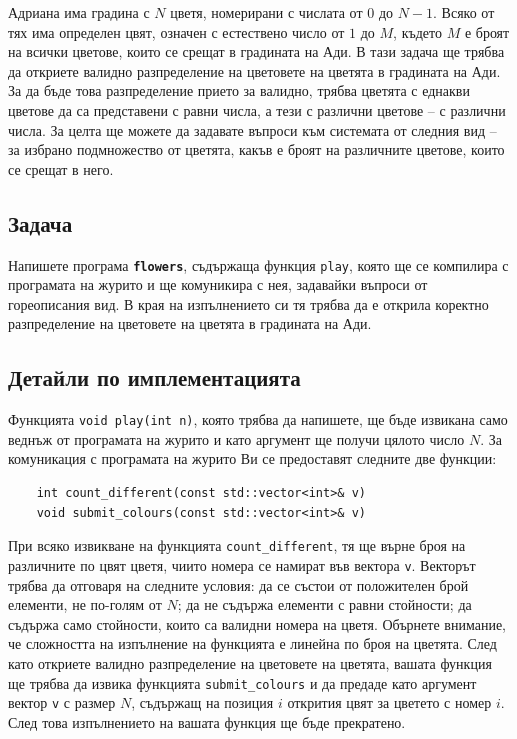 \documentclass[12pt]{article}
\begin{document}
\renewcommand{\header}{
	XLIII НАЦИОНАЛНА ОЛИМПИАДА ПО ИНФОРМАТИКА\\
	Областен кръг, 2 февруари 2027 г.\\
	Група A – 11, 12 клас
}

Адриана има градина с $N$ цветя, номерирани с числата от $0$ до $N-1$. Всяко от тях има определен цвят, означен с естествено число от $1$ до $M$, където $M$ е броят на всички цветове, които се срещат в градината на Ади. В тази задача ще трябва да откриете валидно разпределение на цветовете на цветята в градината на Ади. За да бъде това разпределение прието за валидно, трябва цветята с еднакви цветове да са представени с равни числа, а тези с различни цветове – с различни числа. За целта ще можете да задавате въпроси към системата от следния вид – за избрано подмножество от цветята, какъв е броят на различните цветове, които се срещат в него.

\subsection{Задача}
Напишете програма \textbf{\texttt{flowers}}, съдържаща функция \texttt{play}, която ще се компилира с програмата на журито и ще комуникира с нея, задавайки въпроси от гореописания вид. В края на изпълнението си тя трябва да е открила коректно разпределение на цветовете на цветята в градината на Ади.

\subsection{Детайли по имплементацията}
Функцията \texttt{void play(int n)}, която трябва да напишете, ще бъде извикана само веднъж от програмата на журито и като аргумент ще получи цялото число $N$. За комуникация с програмата на журито Ви се предоставят следните две функции:

\begin{lstlisting}
    int count_different(const std::vector<int>& v)
    void submit_colours(const std::vector<int>& v)
\end{lstlisting}

При всяко извикване на функцията \texttt{count\_different}, тя ще върне броя на различните по цвят цветя, чиито номера се намират във вектора \texttt{v}. Векторът трябва да отговаря на следните условия: да се състои от положителен брой елементи, не по-голям от $N$; да не съдържа елементи с равни стойности; да съдържа само стойности, които са валидни номера на цветя. Обърнете внимание, че сложността на изпълнение на функцията е линейна по броя на цветята. След като откриете валидно разпределение на цветовете на цветята, вашата функция ще трябва да извика функцията \texttt{submit\_colours} и да предаде като аргумент вектор \texttt{v} с размер $N$, съдържащ на позиция $i$ открития цвят за цветето с номер $i$. След това изпълнението на вашата функция ще бъде прекратено.
\end{document}
